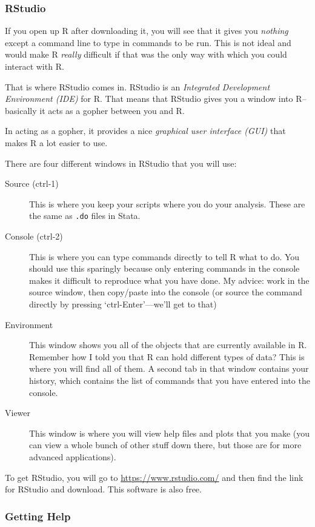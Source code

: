 \documentclass[]{article}
\begin{document}
\subsubsection{RStudio}\label{rstudio}

If you open up R after downloading it, you will see that it gives you
\emph{nothing} except a command line to type in commands to be run. This
is not ideal and would make R \emph{really} difficult if that was the
only way with which you could interact with R.

That is where RStudio comes in. RStudio is an \emph{Integrated
Development Environment (IDE)} for R. That means that RStudio gives you
a window into R--basically it acts as a gopher between you and R.

In acting as a gopher, it provides a nice \emph{graphical user interface
(GUI)} that makes R a lot easier to use.

There are four different windows in RStudio that you will use:

\begin{description}
\item[Source (ctrl-1)]
This is where you keep your scripts where you do your analysis. These
are the same as {\texttt{.do}} files in Stata.
\item[Console (ctrl-2)]
This is where you can type commands directly to tell R what to do. You
should use this sparingly because only entering commands in the console
makes it difficult to reproduce what you have done. My advice: work in
the source window, then copy/paste into the console (or source the
command directly by pressing `ctrl-Enter'---we'll get to that)
\item[Environment]
This window shows you all of the objects that are currently available in
R. Remember how I told you that R can hold different types of data? This
is where you will find all of them. A second tab in that window contains
your history, which contains the list of commands that you have entered
into the console.
\item[Viewer]
This window is where you will view help files and plots that you make
(you can view a whole bunch of other stuff down there, but those are for
more advanced applications).
\end{description}

To get RStudio, you will go to \url{https://www.rstudio.com/} and then
find the link for RStudio and download. This software is also free.

\subsubsection{Getting Help}\label{getting-help}
\end{document}

